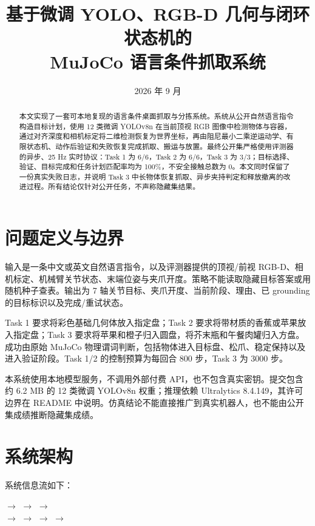 \documentclass[11pt,a4paper]{ctexart}
\title{基于微调 YOLO、RGB-D 几何与闭环状态机的\\MuJoCo 语言条件抓取系统}
\author{\todo{姓名、学号、组员信息}}
\date{2026 年 9 月}
\begin{document}
\maketitle

\begin{abstract}
本文实现了一套可本地复现的语言条件桌面抓取与分拣系统。系统从公开自然语言指令构造目标计划，使用 12 类微调 YOLOv8n 在当前顶视 RGB 图像中检测物体与容器，通过对齐深度和相机标定将二维检测恢复为世界坐标，再由阻尼最小二乘逆运动学、有限状态机、动作后验证和失败恢复完成抓取、搬运与放置。最终公开集严格使用评测器的异步、25 Hz 实时协议：Task 1 为 6/6，Task 2 为 6/6，Task 3 为 3/3；目标选择、验证、目标完成和任务计划匹配率均为 100\%，不安全接触总数为 0。本文同时保留了一份真实失败日志，并说明 Task 3 中长物体恢复抓取、异步夹持判定和释放撤离的改进过程。所有结论仅针对公开任务，不声称隐藏集结果。
\end{abstract}

\section{问题定义与边界}

输入是一条中文或英文自然语言指令，以及评测器提供的顶视/前视 RGB-D、相机标定、机械臂关节状态、末端位姿与夹爪开度。策略不能读取隐藏目标答案或用随机种子查表。输出为 7 轴关节目标、夹爪开度、当前阶段、理由、已 grounding 的目标标识以及完成/重试状态。

Task 1 要求将彩色基础几何体放入指定盘；Task 2 要求将带材质的香蕉或苹果放入指定盘；Task 3 要求将苹果和橙子归入圆盘，将芥末瓶和午餐肉罐归入方盘。成功由原始 MuJoCo 物理谓词判断，包括物体进入目标盘、松爪、稳定保持以及进入验证阶段。Task 1/2 的控制预算为每回合 800 步，Task 3 为 3000 步。

本系统使用本地模型服务，不调用外部付费 API，也不包含真实密钥。提交包含约 6.2 MB 的 12 类微调 YOLOv8n 权重；推理依赖 Ultralytics 8.4.149，其许可边界在 README 中说明。仿真结论不能直接推广到真实机器人，也不能由公开集成绩推断隐藏集成绩。

\section{系统架构}

系统信息流如下：

\begin{center}
 $\rightarrow$
 $\rightarrow$
 $\rightarrow$
\\[0.5em]
$\rightarrow$  $\rightarrow$
 $\rightarrow$
 $\rightarrow$
\end{center}
\end{document}
